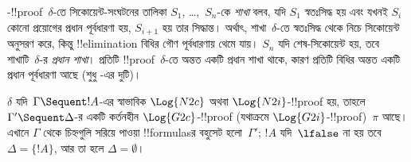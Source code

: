 \documentclass[../../../include/open-logic-section]{subfiles}
\begin{document}
-!!{proof}~$\delta$-তে
সিকোয়েন্ট-সংঘটনের তালিকা $S_1$,
\dots,~$S_n$-কে \emph{শাখা} বলব,
যদি $S_1$ স্বতঃসিদ্ধ হয় এবং
যখনই $S_i$ কোনো প্রয়োগের
প্রধান পূর্বধারণা হয়,
$S_{i+1}$ হয় তার সিদ্ধান্ত।
অর্থাৎ, শাখা~$\delta$-তে স্বতঃসিদ্ধ থেকে
নিচে সিকোয়েন্ট অনুসরণ করে,
কিন্তু !!{elimination} বিধির
গৌণ পূর্বধারণায় থেমে যায়।
$S_n$ যদি শেষ-সিকোয়েন্ট হয়,
তবে শাখাটি~$\delta$-র
\emph{প্রধান শাখা}। প্রতিটি
!!{proof}~$\delta$-তে অন্তত একটি
প্রধান শাখা থাকে, কারণ প্রতিটি
বিধির অন্তত একটি প্রধান পূর্বধারণা
আছে (শুধু \Intro{\land}-এর দুটি)।


\begin{prop}
$\delta$ যদি~$\Gamma \Sequent !A$-এর
স্বাভাবিক $\Log{N2c}$ অথবা
$\Log{N2i}$-!!{proof} হয়,
তাহলে $\Gamma' \Sequent \Delta$-র
একটি কর্তনহীন $\Log{G2c}$-!!{proof}
(যথাক্রমে $\Log{G2i}$-!!{proof})~$\pi$
আছে। এখানে $\Gamma$ থেকে চিহ্নগুলি
সরিয়ে পাওয়া !!{formula}sর বহুসেট
হলো~$\Gamma'$; $!A$ যদি~$\lfalse$ না হয়
তবে $\Delta = \{!A\}$, আর তা হলে
$\Delta = \emptyset$।
\end{prop}
\end{document}
